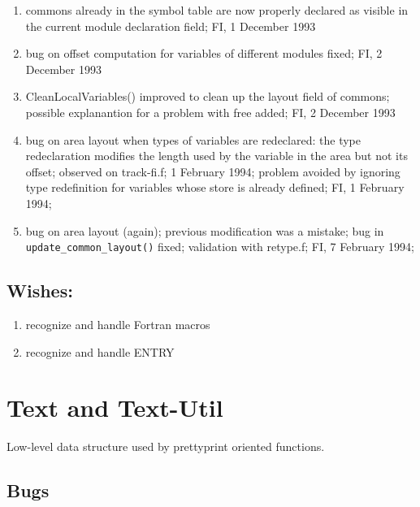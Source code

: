 \begin{enumerate}
  \item commons already in the symbol table are now properly declared as
        visible in the current module declaration field; FI, 1 December 1993

  \item bug on offset computation for variables of different modules
        fixed; FI, 2 December 1993

  \item CleanLocalVariables() improved to clean up the layout field of
        commons; possible explanantion for a problem with free added;
        FI, 2 December 1993

  \item bug on area layout when types of variables are redeclared: the
        type redeclaration modifies the length used by the variable in
        the area but not its offset; observed on track-fi.f; 1 February
        1994; problem avoided by ignoring type redefinition for
        variables whose store is already defined; FI, 1 February 1994;

  \item bug on area layout (again); previous modification was a mistake;
        bug in {\tt update\_common\_layout()} fixed; validation with retype.f;
        FI, 7 February 1994;

\end{enumerate}

\subsection{Wishes:}

\begin{enumerate}

  \item recognize and handle Fortran macros

  \item recognize and handle ENTRY

\end{enumerate}

\section{Text and Text-Util}

Low-level data structure used by prettyprint oriented functions.

\subsection{Bugs}

